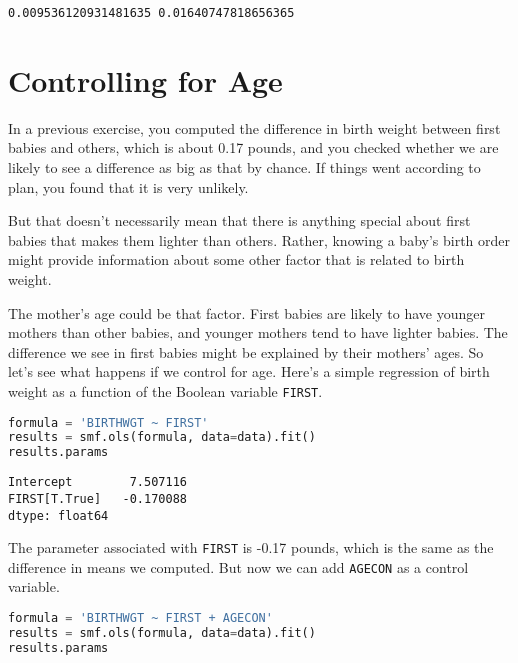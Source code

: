 \begin{lstlisting}[style=output]
0.009536120931481635 0.01640747818656365
\end{lstlisting}

\section{Controlling for Age}\label{controlling-for-age}

In a previous exercise, you computed the difference in birth weight
between first babies and others, which is about 0.17 pounds, and you
checked whether we are likely to see a difference as big as that by
chance. If things went according to plan, you found that it is very
unlikely.

But that doesn't necessarily mean that there is anything special about
first babies that makes them lighter than others. Rather, knowing a
baby's birth order might provide information about some other factor
that is related to birth weight.

The mother's age could be that factor. First babies are likely to have
younger mothers than other babies, and younger mothers tend to have
lighter babies. The difference we see in first babies might be explained
by their mothers' ages. So let's see what happens if we control for age.
Here's a simple regression of birth weight as a function of the Boolean
variable \passthrough{\lstinline!FIRST!}.

\begin{lstlisting}[language=Python,style=source]
formula = 'BIRTHWGT ~ FIRST'
results = smf.ols(formula, data=data).fit()
results.params
\end{lstlisting}

\begin{lstlisting}[style=output]
Intercept        7.507116
FIRST[T.True]   -0.170088
dtype: float64
\end{lstlisting}

The parameter associated with \passthrough{\lstinline!FIRST!} is -0.17
pounds, which is the same as the difference in means we computed. But
now we can add \passthrough{\lstinline!AGECON!} as a control variable.

\begin{lstlisting}[language=Python,style=source]
formula = 'BIRTHWGT ~ FIRST + AGECON'
results = smf.ols(formula, data=data).fit()
results.params
\end{lstlisting}

